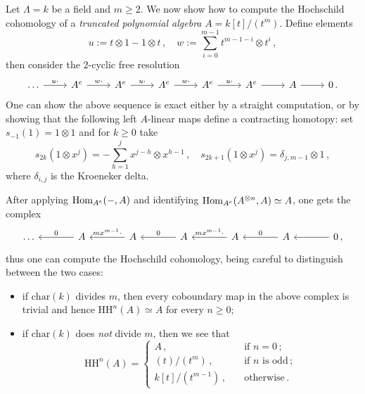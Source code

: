 	\begin{ex}
		Let $\Lambda = k$ be a field and $m \ge 2$.
		We now show how to compute the Hochschild cohomology
		of a \emph{truncated polynomial algebra} $A = k[t]/(t^m)$.
		Define elements
		\begin{equation*}
			u := t \otimes 1 - 1 \otimes t\,,
			\quad w := \sum_{i=0}^{m-1} t^{m-1-i} \otimes t^{i}\,,
		\end{equation*}
		then consider the $2$-cyclic free resolution
		\begin{equation*}
			\begin{tikzcd}
				\dots \ar[r, "u \cdot"]
				& A^{e} \ar[r, "w \cdot"]
				& A^{e} \ar[r, "u \cdot"]
				& A^{e} \ar[r, "w \cdot"]
				& A^{e} \ar[r, "u \cdot"]
				& A^{e} \ar[r]
				& A \ar[r]
				& 0\,.
			\end{tikzcd}
		\end{equation*}
		One can show the above sequence is exact either by a straight computation,
		or by showing that the following left $A$-linear maps define a 
		contracting homotopy: set $s_{-1}(1) = 1 \otimes 1$ and for $k \ge 0$ take
		\begin{equation*}
			s_{2k}(1 \otimes x^{j}) = -\sum_{h=1}^{j} x^{j-h} \otimes x^{h-1} \,,
			\quad s_{2k+1}(1 \otimes x^{j}) = \delta_{j,m-1} \otimes 1\,,
		\end{equation*}
		where $\delta_{i,j}$ is the Kroeneker delta.
		
		After applying $\operatorname{Hom}_{A^{e}}(-,A)$ and identifying 
		$\operatorname{Hom}_{A^{e}}(A^{\otimes n},A) \simeq A$, one gets the complex
		\begin{equation*}
			\begin{tikzcd}[column sep=large]
				\dots 
				& A \ar[l, "0"']
				& A \ar[l, "mx^{m-1} \cdot"']
				& A \ar[l, "0"']
				& A \ar[l, "mx^{m-1} \cdot"']
				& A \ar[l, "0"']
				& 0 \ar[l] \,,
			\end{tikzcd}
		\end{equation*}
		thus one can compute the Hochschild cohomology,
		being careful to distinguish between the two cases:
		\begin{itemize}
			\item if $\mathrm{char}(k)$ divides $m$, then every coboundary
			map in the above complex is trivial and hence $\mathrm{HH}^{n}(A) \simeq A$
			for every $n \ge 0$;
			\item if $\mathrm{char}(k)$ does \emph{not} divide $m$,
			then we see that
			\begin{equation*}
				\mathrm{HH}^{n}(A)  =
				\begin{cases}
					A\,, \quad &\text{if } n=0\,; \\
					(t)/(t^{m})\,, \quad &\text{if } n \text{ is odd}\,; \\
					k[t]/(t^{m-1})\,, \quad &\text{otherwise}\,.
				\end{cases}
			\end{equation*}
		\end{itemize}
	\end{ex}
	

